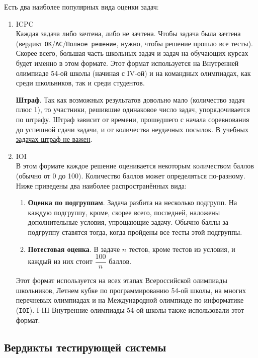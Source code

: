 \documentclass{article}
\begin{document}
	Есть два наиболее популярных вида оценки задач:
	
	\begin{enumerate}
		\item{{\large ICPC}\\
			Каждая задача либо зачтена, либо не зачтена. Чтобы задача была зачтена (вердикт \texttt{OK}/\texttt{AC}/\texttt{Полное решение}, нужно, чтобы решение прошло все тесты). Скорее всего, большая часть школьных задач и задач на обучающих курсах будет именно в этом формате. Этот формат используется на Внутренней олимпиаде 54-ой школы (начиная с IV-ой) и на командных олимпиадах, как среди школьников, так и среди студентов.
			
			\textbf{Штраф}. Так как возможных результатов довольно мало (количество задач плюс 1), то участники, решившие одинаковое число задач, упорядочивается по штрафу. Штраф зависит от времени, прошедшего с начала соревнования до успешной сдачи задачи, и от количества неудачных посылок. \underline{В учебных задачах штраф не важен}.
		}
		
		\item{{\large IOI}\\
			В этом формате каждое решение оценивается некоторым количеством баллов (обычно от 0 до 100). Количество баллов может определяться по-разному. Ниже приведены два наиболее распространённых вида:
			\begin{enumerate}
				\item{\textbf{Оценка по подгруппам}. Задача разбита на несколько подгрупп. На каждую подгруппу, кроме, скорее всего, последней, наложены дополнительные условия, упрощающие задачу. Обычно баллы за подгруппу ставятся тогда, когда пройдены все тесты этой подгруппы.}
				\item{\textbf{Потестовая оценка}. В задаче $n$ тестов, кроме тестов из условия, и каждый из них стоит $\dfrac{100}{n}$ баллов.}
			\end{enumerate}
			
			Этот формат используется на всех этапах Всероссийской олимпиады школьников, Летнем кубке по программированию 54-ой школы, на многих перечневых олимпиадах и на Международной олимпиаде по информатике (\texttt{IOI}). I-III Внутренние олимпиады 54-ой школы также использовали этот формат.
		}
	\end{enumerate}

	\subsection{Вердикты тестирующей системы}
	\label{sec:task-scoring}
\end{document}
